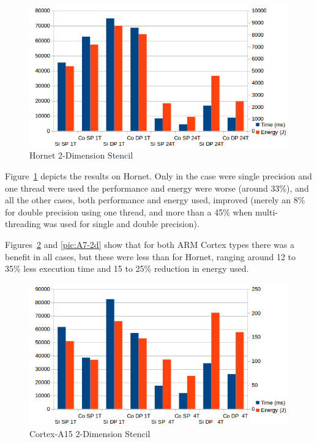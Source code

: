 \documentclass{acm_proc_article-sp}
\begin{document}
\begin{figure}[ht!]
  \centering
  \includegraphics[scale=0.5]{results/Hornet-2D}
  \caption{Hornet 2-Dimension Stencil}
  \label{pic:hornet-2d}
\end{figure}
Figure~\ref{pic:hornet-2d} depicts the results on Hornet. Only in the case were single precision and one thread were used the performance and energy were worse (around 33\%), and all the other cases, both performance and energy used, improved (merely an 8\% for double precision using one thread, and more than a 45\% when multi-threading was used for single and double precision).

Figures~\ref{pic:A15-2d} and \ref{pic:A7-2d} show that for both ARM Cortex types there was a benefit in all cases, but these were less than for Hornet, ranging around 12 to 35\% less execution time and 15 to 25\% reduction in energy used.
\begin{figure}[ht!]
  \centering
  \includegraphics[scale=0.5]{results/A15-2D}
  \caption{Cortex-A15 2-Dimension Stencil}
  \label{pic:A15-2d}
\end{figure}
\end{document}
